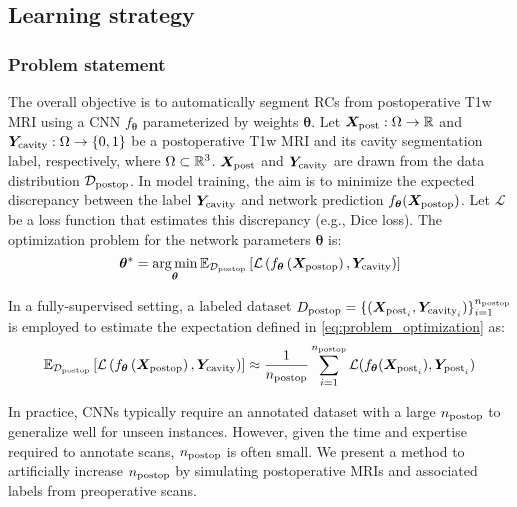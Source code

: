 \subsection{Learning strategy}
\label{sec:learning_strategy}


\subsubsection{Problem statement}

\newcommand{\loss}{\mathcal{L}}
\newcommand{\expec}{\mathbb{E}}
\newcommand{\exppost}{\expec_{\Dom\post}}

The overall objective is to automatically segment \acp{RC} from postoperative \ac{T1w} \ac{MRI} using a \ac{CNN} $f_{\bm{\theta}}$ parameterized by weights $\bm{\theta}$.
Let $\bm{X}_{\text{post}} : \Omega \to \mathbb{R}$ and $\bm{Y}_{\textnormal{cavity}}  : \Omega \to \{ 0, 1 \}$ be a postoperative \ac{T1w} \ac{MRI} and its cavity segmentation label, respectively, where $\Omega \subset \mathbb{R}^3$.
$\bm{X}_{\text{post}}$ and $\bm{Y}_{\text{cavity}}$ are drawn from the data distribution $\mathcal{D}_{\textnormal{postop}}$.
In model training, the aim is to minimize the expected discrepancy between the label $\bm{Y}_{\textnormal{cavity}}$ and network prediction $f_{\bm{\theta}}(\bm{X}_{\textnormal{postop}})$.
Let $\loss$ be a loss function that estimates this discrepancy (e.g., Dice loss).
The optimization problem for the network parameters $\bm{\theta}$ is:
\begin{equation}
  \bm{\theta}^* =
  \argmin_{\bm{\theta}}
  \exppost \left[
    \loss \left(
      f_{\bm{\theta}} \left( \X\post \right),
      \Y\cav
    \right)
  \right]
  \label{eq:problem_optimization}
\end{equation}


In a fully-supervised setting, a labeled dataset $D_{\textnormal{postop}} = \{ (\bm{X}_{\text{post}_i}, \bm{Y}_{\text{cavity}_i}) \}_{i = 1}^{n_{\textnormal{postop}}}$ is employed to estimate the expectation defined in \cref{eq:problem_optimization} as:
\begin{equation}
  \exppost \left[
    \loss \left(
      f_{\bm{\theta}} \left( \X\post \right), \Y\cav
    \right)
  \right]
  \approx \frac{1}{n\post} \sum_{i=1}^{n\post} \loss(f_{\bm{\theta}}(\X_{\text{post}_i}), \Y_{\text{post}_i})
  \label{eq:problem_optimization_fully}
\end{equation}

In practice, \acp{CNN} typically require an annotated dataset with a large $n_{\textnormal{postop}}$ to generalize well for unseen instances.
However, given the time and expertise required to annotate scans, $n_{\textnormal{postop}}$ is often small.
We present a method to artificially increase $n_{\textnormal{postop}}$ by simulating postoperative \acp{MRI} and associated labels from preoperative scans.


